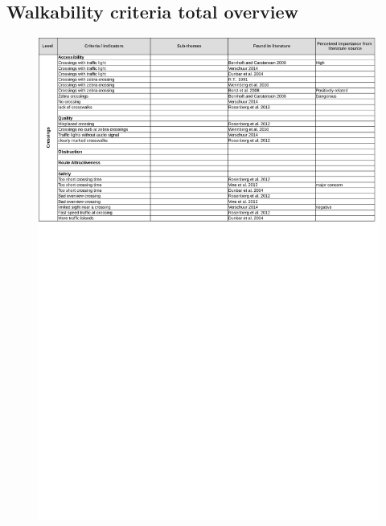 \begin{appendix}
\section{Walkability criteria total overview}\label{Acriteria}
\begin{figure}[h]
\includegraphics[width=\textwidth]{img/annex/A1_crossings_criteria.pdf}

\end{figure}
\end{appendix}
